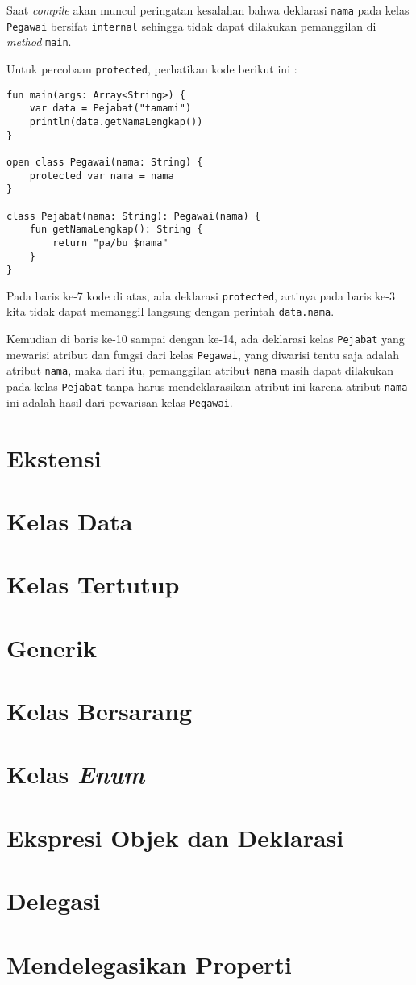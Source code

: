 Saat \textit{compile} akan muncul peringatan kesalahan bahwa deklarasi \texttt{nama} pada kelas \texttt{Pegawai} bersifat \texttt{internal} sehingga tidak dapat dilakukan pemanggilan di \textit{method} \texttt{main}.

Untuk percobaan \texttt{protected}, perhatikan kode berikut ini :

\begin{lstlisting}
fun main(args: Array<String>) {
	var data = Pejabat("tamami")
	println(data.getNamaLengkap())
}

open class Pegawai(nama: String) {
	protected var nama = nama
}

class Pejabat(nama: String): Pegawai(nama) {
	fun getNamaLengkap(): String {
		return "pa/bu $nama"
	}
}
\end{lstlisting}

Pada baris ke-7 kode di atas, ada deklarasi \texttt{protected}, artinya pada baris ke-3 kita tidak dapat memanggil langsung dengan perintah \texttt{data.nama}. 

Kemudian di baris ke-10 sampai dengan ke-14, ada deklarasi kelas \texttt{Pejabat} yang mewarisi atribut dan fungsi dari kelas \texttt{Pegawai}, yang diwarisi tentu saja adalah atribut \texttt{nama}, maka dari itu, pemanggilan atribut \texttt{nama} masih dapat dilakukan pada kelas \texttt{Pejabat} tanpa harus mendeklarasikan atribut ini karena atribut \texttt{nama} ini adalah hasil dari pewarisan kelas \texttt{Pegawai}.

\section{Ekstensi}

\section{Kelas Data}

\section{Kelas Tertutup}

\section{Generik}

\section{Kelas Bersarang}

\section{Kelas \textit{Enum}}

\section{Ekspresi Objek dan Deklarasi}

\section{Delegasi}

\section{Mendelegasikan Properti}